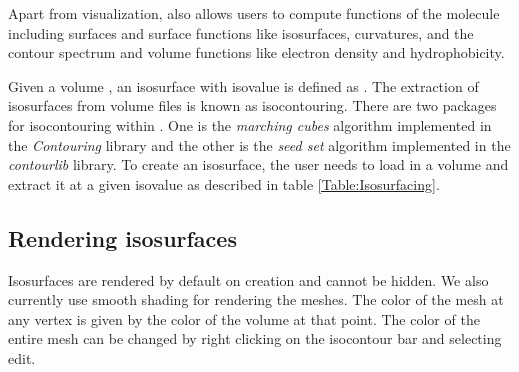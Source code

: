  \label{Chapter:computations}

Apart from visualization, \TexMol also allows users to compute
functions of the molecule including surfaces and surface functions
like isosurfaces, curvatures, and the contour spectrum and volume
functions like electron density and hydrophobicity.


Given a volume , an isosurface with isovalue  is
defined as . The extraction of isosurfaces from
volume files is known as isocontouring. There are two packages for
isocontouring within \TexMol. One is the \emph{marching cubes}
algorithm implemented in the \emph{Contouring} library and the other
is the \emph{seed set} algorithm implemented in the
\emph{contourlib} library. To create an isosurface, the user needs
to load in a volume and extract it at a given isovalue as described
in table \ref{Table:Isosurfacing}.



\subsection{Rendering isosurfaces}

Isosurfaces are rendered by default on creation and cannot be
hidden. We also currently use smooth shading for rendering the
meshes. The color of the mesh at any vertex is given by the color of
the volume at that point. The color of the entire mesh can be
changed by right clicking on the isocontour bar and selecting edit.




